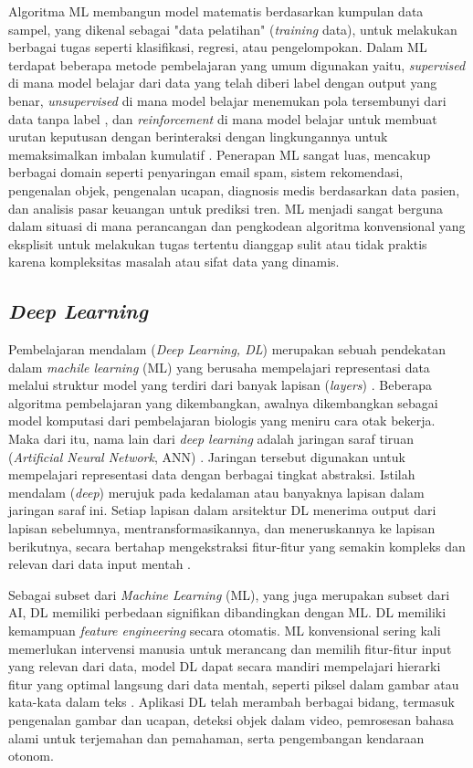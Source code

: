 Algoritma ML membangun model matematis berdasarkan kumpulan data sampel, yang dikenal sebagai "data pelatihan" (\textit{training} data), untuk melakukan berbagai tugas seperti klasifikasi, regresi, atau pengelompokan.
Dalam ML terdapat beberapa metode pembelajaran yang umum digunakan yaitu, \textit{supervised} di mana model belajar dari data yang telah diberi label dengan output yang benar, \textit{unsupervised} di mana model belajar menemukan pola tersembunyi dari data tanpa label , dan \textit{reinforcement} di mana model belajar untuk membuat urutan keputusan dengan berinteraksi dengan lingkungannya untuk memaksimalkan imbalan kumulatif \cite{choi2020IntroductionML_NN_DL}.
Penerapan ML sangat luas, mencakup berbagai domain seperti penyaringan email spam, sistem rekomendasi, pengenalan objek, pengenalan ucapan, diagnosis medis berdasarkan data pasien, dan analisis pasar keuangan untuk prediksi tren.
ML menjadi sangat berguna dalam situasi di mana perancangan dan pengkodean algoritma konvensional yang eksplisit untuk melakukan tugas tertentu dianggap sulit atau tidak praktis karena kompleksitas masalah atau sifat data yang dinamis.


\subsection{\textit{Deep Learning}}
Pembelajaran mendalam (\textit{Deep Learning, DL}) merupakan sebuah pendekatan dalam \textit{machile learning} (ML) yang berusaha mempelajari representasi data melalui struktur model yang terdiri dari banyak lapisan (\textit{layers}) \cite{IanGoodfellow2016DeepLearning}.
Beberapa algoritma pembelajaran yang dikembangkan, awalnya dikembangkan sebagai model komputasi dari pembelajaran biologis yang meniru cara otak bekerja.
Maka dari itu, nama lain dari \textit{deep learning} adalah jaringan saraf tiruan (\textit{Artificial Neural Network}, ANN) \cite{IanGoodfellow2016DeepLearning}.
Jaringan tersebut digunakan untuk mempelajari representasi data dengan berbagai tingkat abstraksi.
Istilah mendalam (\textit{deep}) merujuk pada kedalaman atau banyaknya lapisan dalam jaringan saraf ini.
Setiap lapisan dalam arsitektur DL menerima output dari lapisan sebelumnya, mentransformasikannya, dan meneruskannya ke lapisan berikutnya, secara bertahap mengekstraksi fitur-fitur yang semakin kompleks dan relevan dari data input mentah \cite{IanGoodfellow2016DeepLearning}.

Sebagai subset dari \textit{Machine Learning} (ML), yang juga merupakan subset dari AI, DL memiliki perbedaan signifikan dibandingkan dengan ML.
DL memiliki kemampuan \textit{feature engineering} secara otomatis.
ML konvensional sering kali memerlukan intervensi manusia untuk merancang dan memilih fitur-fitur input yang relevan dari data, model DL dapat secara mandiri mempelajari hierarki fitur yang optimal langsung dari data mentah, seperti piksel dalam gambar atau kata-kata dalam teks \cite{IanGoodfellow2016DeepLearning}.
Aplikasi DL telah merambah berbagai bidang, termasuk pengenalan gambar dan ucapan, deteksi objek dalam video, pemrosesan bahasa alami untuk terjemahan dan pemahaman, serta pengembangan kendaraan otonom.


